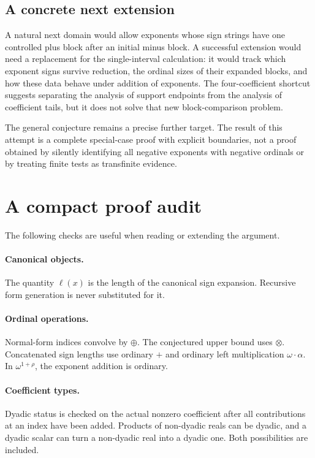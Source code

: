 \documentclass[11pt,letterpaper]{article}
\theoremstyle{definition}
\theoremstyle{remark}
\newcommand{\bd}{\ell}
\newcommand{\ns}{\mathbin{\oplus}}
\newcommand{\np}{\mathbin{\otimes}}
\begin{document}
\subsection{A concrete next extension}
A natural next domain would allow exponents whose sign strings have one
controlled plus block after an initial minus block. A successful extension
would need a replacement for the single-interval calculation: it would
track which exponent signs survive reduction, the ordinal sizes of their
expanded blocks, and how these data behave under addition of exponents.
The four-coefficient shortcut suggests separating the analysis of support
endpoints from the analysis of coefficient tails, but it does not solve
that new block-comparison problem.

The general conjecture remains a precise further target. The result of
this attempt is a complete special-case proof with explicit boundaries,
not a proof obtained by silently identifying all negative exponents with
negative ordinals or by treating finite tests as transfinite evidence.

\appendix
\section{A compact proof audit}

The following checks are useful when reading or extending the argument.

\paragraph{Canonical objects.}
The quantity \(\bd(x)\) is the length of the canonical sign expansion.
Recursive form generation is never substituted for it.

\paragraph{Ordinal operations.}
Normal-form indices convolve by \(\ns\). The conjectured upper bound
uses \(\np\). Concatenated sign lengths use ordinary \(+\) and
ordinary left multiplication \(\omega\cdot\alpha\). In
\(\omega^{1+\rho}\), the exponent addition is ordinary.

\paragraph{Coefficient types.}
Dyadic status is checked on the actual nonzero coefficient after all
contributions at an index have been added. Products of non-dyadic reals
can be dyadic, and a dyadic scalar can turn a non-dyadic real into a
dyadic one. Both possibilities are included.
\end{document}
